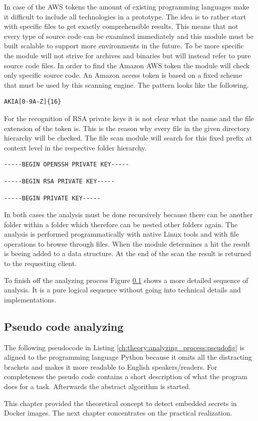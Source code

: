 In case of the AWS tokens the amount of existing programming languages make it difficult to include all technologies in a prototype. 
The idea is to rather start with specific files to get exactly comprehensible results. 
This means that not every type of source code can be examined immediately and this module must be built scalable to support more environments in the future.
To be more specific the module will not strive for archives and binaries but will instead refer to pure source code files.
In order to find the Amazon AWS token the module will check only specific source code.
An Amazon access token is based on a fixed scheme that must be used by this scanning engine.
The pattern looks like the following.
\begin{lstlisting}
AKIA[0-9A-Z]{16}
\end{lstlisting}

For the recognition of RSA private keys it is not clear what the name and the file extension of the token is.
This is the reason why every file in the given directory hierarchy will be checked.
The file scan module will search for this fixed prefix at context level in the respective folder hierarchy.
\begin{lstlisting}
-----BEGIN OPENSSH PRIVATE KEY-----
\end{lstlisting}
\begin{lstlisting}
-----BEGIN RSA PRIVATE KEY-----
\end{lstlisting}
\begin{lstlisting}
-----BEGIN PRIVATE KEY-----
\end{lstlisting}

In both cases the analysis must be done recursively because there can be another folder within a folder which therefore can be nested other folders again.
The analysis is performed programmatically with native Linux tools and with file operations to browse through files.
When the module determines a hit the result is beeing added to a data structure.
At the end of the scan the result is returned to the requesting client.

To finish off the analyzing process Figure \ref{ch:theory:analyzing_pseudocode} shows a more detailed sequence of analysis.
It is a pure logical sequence without going into technical details and implementations. 

\subsection{Pseudo code analyzing}
\label{ch:theory:analyzing_pseudocode}
The following pseudocode in Listing \ref{ch:theory:analyzing_process:pseudofig} is aligned to the programming language Python because it omits all the distracting brackets and makes it more readable to English speakers/readers.
For completeness the pseudo code contains a short description of what the program does for a task. 
Afterwards the abstract algorithm is started.

This chapter provided the theoretical concept to detect embedded secrets in Docker images. The next chapter concentrates on the practical realization.

